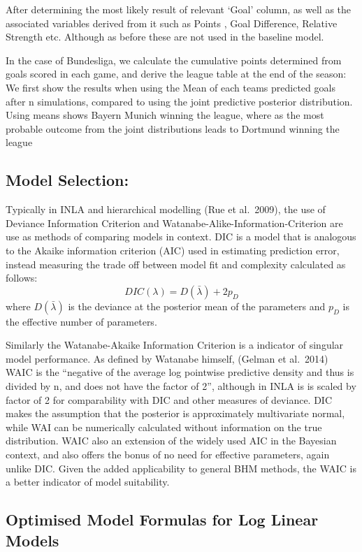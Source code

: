 \documentclass[
]{article}
\begin{document}
After determining the most likely result of relevant `Goal' column, as
well as the associated variables derived from it such as Points , Goal
Difference, Relative Strength etc. Although as before these are not used
in the baseline model.

In the case of Bundesliga, we calculate the cumulative points determined
from goals scored in each game, and derive the league table at the end
of the season: We first show the results when using the Mean of each
teams predicted goals after n simulations, compared to using the joint
predictive posterior distribution. Using means shows Bayern Munich
winning the league, where as the most probable outcome from the joint
distributions leads to Dortmund winning the league

\hypertarget{model-selection}{%
\subsection{Model Selection:}\label{model-selection}}

Typically in INLA and hierarchical modelling (Rue et al.~2009), the use
of Deviance Information Criterion and
Watanabe-Alike-Information-Criterion are use as methods of comparing
models in context. DIC is a model that is analogous to the Akaike
information criterion (AIC) used in estimating prediction error, instead
measuring the trade off between model fit and complexity calculated as
follows: \[ DIC(\lambda) =  D(\bar{\lambda}) + 2p_D \] where
\(D(\bar{\lambda})\) is the deviance at the posterior mean of the
parameters and \(p_D\) is the effective number of parameters.

Similarly the Watanabe-Akaike Information Criterion is a indicator of
singular model performance. As defined by Watanabe himself, (Gelman et
al.~2014) WAIC is the ``negative of the average log pointwise predictive
density and thus is divided by n, and does not have the factor of 2'',
although in INLA is is scaled by factor of 2 for comparability with DIC
and other measures of deviance. DIC makes the assumption that the
posterior is approximately multivariate normal, while WAI can be
numerically calculated without information on the true distribution.
WAIC also an extension of the widely used AIC in the Bayesian context,
and also offers the bonus of no need for effective parameters, again
unlike DIC. Given the added applicability to general BHM methods, the
WAIC is a better indicator of model suitability.

\hypertarget{optimised-model-formulas-for-log-linear-models}{%
\subsection{Optimised Model Formulas for Log Linear
Models}\label{optimised-model-formulas-for-log-linear-models}}
\end{document}

